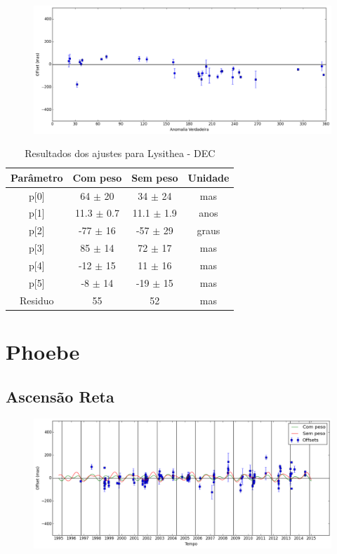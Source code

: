 \documentclass[11pt,a4paper]{report}
\begin{document}
\begin{figure}[h]
\includegraphics[scale=0.45]{Lysithea/DEC_anom.png}  
\end{figure}

\begin{table}[h!]
\caption{\label{Tab: Lysithea-DEC} Resultados dos ajustes para Lysithea - DEC}
\begin{centering}
\begin{tabular}{cccc}
\hline
\hline
Parâmetro & Com peso & Sem peso & Unidade\tabularnewline
\hline
p[0] & 64 $\pm$ 20 & 34 $\pm$ 24 & mas\\
p[1] & 11.3 $\pm$ 0.7 & 11.1 $\pm$ 1.9 & anos\\
p[2] & -77 $\pm$ 16 & -57 $\pm$ 29 & graus\\
p[3] & 85 $\pm$ 14 & 72 $\pm$ 17 & mas\\
p[4] & -12 $\pm$ 15 & 11 $\pm$ 16 & mas\\
p[5] & -8 $\pm$ 14 & -19 $\pm$ 15 & mas\\
Residuo & 55 & 52 & mas\\
\hline 
\end{tabular} 
\par\end{centering}
\end{table}

\chapter*{Phoebe}
\section*{Ascensão Reta}

\begin{figure}[h]
\includegraphics[scale=0.45]{Phoebe/RA.png} 
\end{figure}
\end{document}
